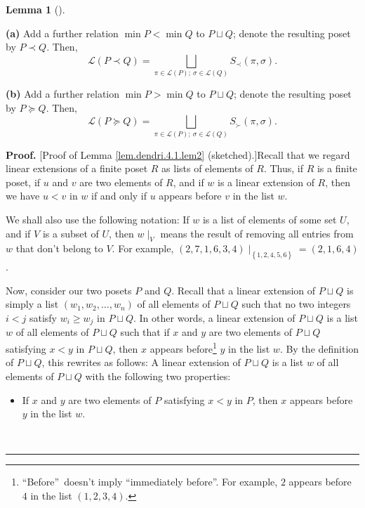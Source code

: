 \documentclass[numbers=enddot,12pt,final,onecolumn,notitlepage]{scrartcl}%
\theoremstyle{definition}
\newtheorem{lem}[theo]{Lemma}
\newenvironment{lemma}[1][]
{\begin{lem}[#1]\begin{leftbar}}
{\end{leftbar}\end{lem}}
\newenvironment{proof}[1][Proof]{\noindent\textbf{#1.} }{\ \rule{0.5em}{0.5em}}
\newenvironment{verlong}{}{}
\begin{document}
\begin{verlong}
\begin{lemma}
\textbf{(a)} Add a further relation $\min P<\min Q$ to $P\sqcup Q$; denote the
resulting poset by $P\left.  \prec\right.  Q$. Then,
\[
\mathcal{L}\left(  P\left.  \prec\right.  Q\right)  =\bigsqcup_{\pi
\in\mathcal{L}\left(  P\right)  ;\ \sigma\in\mathcal{L}\left(  Q\right)
}S_{\prec}\left(  \pi,\sigma\right)  .
\]


\textbf{(b)} Add a further relation $\min P>\min Q$ to $P\sqcup Q$; denote the
resulting poset by $P\left.  \succeq\right.  Q$. Then,
\[
\mathcal{L}\left(  P\left.  \succeq\right.  Q\right)  =\bigsqcup_{\pi
\in\mathcal{L}\left(  P\right)  ;\ \sigma\in\mathcal{L}\left(  Q\right)
}S_{\succ}\left(  \pi,\sigma\right)  .
\]

\end{lemma}

\begin{proof}
[Proof of Lemma \ref{lem.dendri.4.1.lem2} (sketched).]Recall that we regard
linear extensions of a finite poset $R$ as lists of elements of $R$. Thus, if
$R$ is a finite poset, if $u$ and $v$ are two elements of $R$, and if $w$ is a
linear extension of $R$, then we have $u<v$ in $w$ if and only if $u$ appears
before $v$ in the list $w$.

We shall also use the following notation: If $w$ is a list of elements of some
set $U$, and if $V$ is a subset of $U$, then $w\mid_{V}$ means the result of
removing all entries from $w$ that don't belong to $V$. For example, $\left(
2,7,1,6,3,4\right)  \mid_{\left\{  1,2,4,5,6\right\}  }=\left(
2,1,6,4\right)  $.

Now, consider our two posets $P$ and $Q$. Recall that a linear extension of
$P\sqcup Q$ is simply a list $\left(  w_{1},w_{2},\ldots,w_{n}\right)  $ of
all elements of $P\sqcup Q$ such that no two integers $i<j$ satisfy $w_{i}\geq
w_{j}$ in $P\sqcup Q$. In other words, a linear extension of $P\sqcup Q$ is a
list $w$ of all elements of $P\sqcup Q$ such that if $x$ and $y$ are two
elements of $P\sqcup Q$ satisfying $x<y$ in $P\sqcup Q$, then $x$ appears
before\footnote{\textquotedblleft Before\textquotedblright\ doesn't imply
\textquotedblleft immediately before\textquotedblright. For example, $2$
appears before $4$ in the list $\left(  1,2,3,4\right)  $.} $y$ in the list
$w$. By the definition of $P\sqcup Q$, this rewrites as follows: A linear
extension of $P\sqcup Q$ is a list $w$ of all elements of $P\sqcup Q$ with the
following two properties:

\begin{itemize}
\item If $x$ and $y$ are two elements of $P$ satisfying $x<y$ in $P$, then $x$
appears before $y$ in the list $w$.


\end{itemize}
\end{proof}
\end{verlong}
\end{document}
